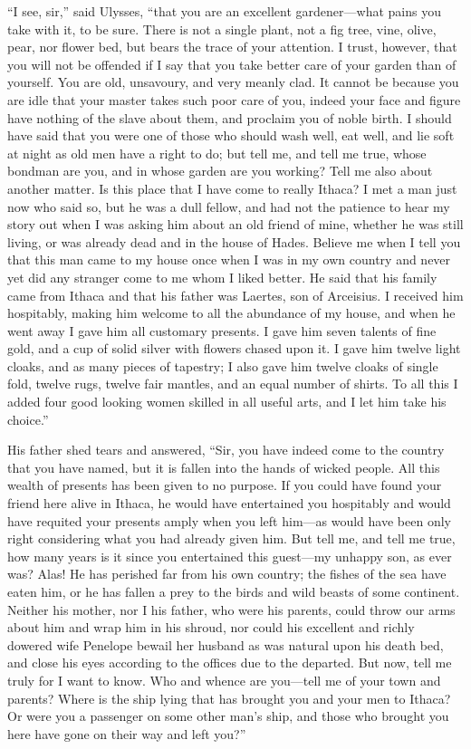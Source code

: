 “I see, sir,” said Ulysses, “that you are an excellent gardener—what pains you
take with it, to be sure. There is not a single plant, not a fig tree, vine,
olive, pear, nor flower bed, but bears the trace of your attention. I trust,
however, that you will not be offended if I say that you take better care of
your garden than of yourself. You are old, unsavoury, and very meanly clad. It
cannot be because you are idle that your master takes such poor care of you,
indeed your face and figure have nothing of the slave about them, and proclaim
you of noble birth. I should have said that you were one of those who should
wash well, eat well, and lie soft at night as old men have a right to do; but
tell me, and tell me true, whose bondman are you, and in whose garden are you
working? Tell me also about another matter. Is this place that I have come to
really Ithaca? I met a man just now who said so, but he was a dull fellow, and
had not the patience to hear my story out when I was asking him about an old
friend of mine, whether he was still living, or was already dead and in the
house of Hades. Believe me when I tell you that this man came to my house once
when I was in my own country and never yet did any stranger come to me whom I
liked better. He said that his family came from Ithaca and that his father was
Laertes, son of Arceisius. I received him hospitably, making him welcome to all
the abundance of my house, and when he went away I gave him all customary
presents. I gave him seven talents of fine gold, and a cup of solid silver with
flowers chased upon it. I gave him twelve light cloaks, and as many pieces of
tapestry; I also gave him twelve cloaks of single fold, twelve rugs, twelve
fair mantles, and an equal number of shirts. To all this I added four good
looking women skilled in all useful arts, and I let him take his choice.”

His father shed tears and answered, “Sir, you have indeed come to the country
that you have named, but it is fallen into the hands of wicked people. All this
wealth of presents has been given to no purpose. If you could have found your
friend here alive in Ithaca, he would have entertained you hospitably and would
have requited your presents amply when you left him—as would have been only
right considering what you had already given him. But tell me, and tell me
true, how many years is it since you entertained this guest—my unhappy son, as
ever was? Alas! He has perished far from his own country; the fishes of the sea
have eaten him, or he has fallen a prey to the birds and wild beasts of some
continent. Neither his mother, nor I his father, who were his parents, could
throw our arms about him and wrap him in his shroud, nor could his excellent
and richly dowered wife Penelope bewail her husband as was natural upon his
death bed, and close his eyes according to the offices due to the departed. But
now, tell me truly for I want to know. Who and whence are you—tell me of your
town and parents? Where is the ship lying that has brought you and your men to
Ithaca? Or were you a passenger on some other man’s ship, and those who brought
you here have gone on their way and left you?”

